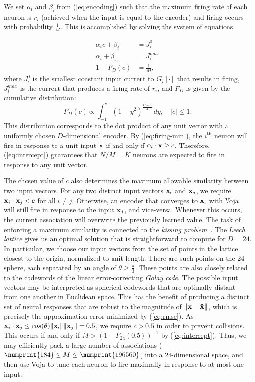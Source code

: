 We set $\alpha_i$ and $\beta_i$ from (\ref{eq:encoding}) such that the maximum firing rate of each neuron is $r_i$ (achieved when the input is equal to the encoder) and firing occurs with probability $\frac{1}{M}$.
This is accomplished by solving the system of equations,

\begin{align}
  \alpha_i c + \beta_i &= J_i^{0} \label{eq:firing-min} \\
  \alpha_i + \beta_i &= J_i^{max} \label{eq:firing-max} \\
  1 - F_D(c) &= \frac{1}{M} ,     \label{eq:intercept} %
\end{align}
%
where $J_i^0$ is the smallest constant input current to $G_i \left[ \cdot \right]$ that results in firing, $J_i^{max}$ is the current that produces a firing rate of $r_i$, and $F_D$ is given by the cumulative distribution:
%
\begin{equation}
  \label{eq:cosine}
  F_D(c) \propto \int_{-1}^c (1 - y^2)^{\frac{D - 3}{2}} \, dy, \quad |c| \le 1 .
\end{equation}
%
This distribution corresponds to the dot product of any unit vector with a uniformly chosen $D$-dimensional encoder.
By (\ref{eq:firing-min}), the $i^\mathrm{th}$ neuron will fire in response to a unit input $\mathbf{x}$ if and only if $\mathbf{e}_i \cdot \mathbf{x} \ge c$.
Therefore, (\ref{eq:intercept}) guarantees that $N / M = K$ neurons are expected to fire in response to any unit vector.

The chosen value of $c$ also determines the maximum allowable similarity between two input vectors.
For any two distinct input vectors $\mathbf{x}_i$ and $\mathbf{x}_j$, we require $\mathbf{x}_i \cdot \mathbf{x}_j < c$ for all $i \ne j$.
Otherwise, an encoder that converges to $\mathbf{x}_i$ with Voja will still fire in response to the input $\mathbf{x}_j$, and vice-versa.
Whenever this occurs, the current association will overwrite the previously learned value.
The task of enforcing a maximum similarity is connected to the {\it kissing problem}~\citep{Conway1999}.
The {\it Leech lattice} gives us an optimal solution that is straightforward to compute for $D=24$.
In particular, we choose our input vectors from the set of points in the lattice closest to the origin, normalized to unit length. 
There are  such points on the 24-sphere, each separated by an angle of $\theta \ge \frac{\pi}{3}$.
These points are also closely related to the codewords of the linear error-correcting {\it Golay code}.
The possible input vectors may be interpreted as spherical codewords that are optimally distant from one another in Euclidean space.
This has the benefit of producing a distinct set of neural responses that are robust to the magnitude of $\|\mathbf{x} - \mathbf{\hat{x}}\|$, which is precisely the approximation error minimized by (\ref{eq:rmse}).
As $\mathbf{x}_i \cdot \mathbf{x}_j \le cos(\theta) \|\mathbf{x}_i\| \|\mathbf{x}_j\| = 0.5$, we require $c > 0.5$ in order to prevent collisions.
This occurs if and only if $M > (1 - F_{24}(0.5))^{-1}$ by (\ref{eq:intercept}).
Thus, we may efficiently pack a large number of associations ($\numprint{184} \le M \le \numprint{196560}$) into a $24$-dimensional space, and then use Voja to tune each neuron to fire maximally in response to at most one input.

